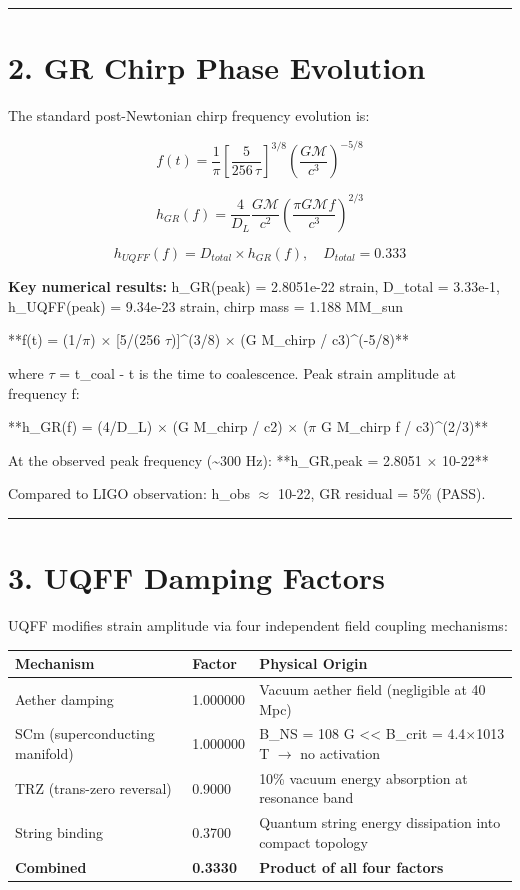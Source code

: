 \documentclass[11pt]{article}
\begin{document}
\noindent\rule{\textwidth}{0.4pt}

\section*{2. GR Chirp Phase Evolution}

The standard post-Newtonian chirp frequency evolution is:

$$f(t) = \frac{1}{\pi}\left[\frac{5}{256\,\tau}\right]^{3/8} \left(\frac{G\mathcal{M}}{c^3}\right)^{-5/8}$$

$$h_{GR}(f) = \frac{4}{D_L}\frac{G\mathcal{M}}{c^2}\left(\frac{\pi G\mathcal{M} f}{c^3}\right)^{2/3}$$

$$h_{UQFF}(f) = D_{total} \times h_{GR}(f),\quad D_{total} = 0.333$$

\textbf{Key numerical results:} h\_GR(peak) = 2.8051e-22 strain, D\_total = 3.33e-1, h\_UQFF(peak) = 9.34e-23 strain, chirp mass = 1.188 MM\_sun

**f(t) = (1/$\pi$) $\times$ [5/(256 $\tau$)]\textasciicircum{}(3/8) $\times$ (G M\_chirp / c3)\textasciicircum{}(-5/8)**

where $\tau$ = t\_coal - t is the time to coalescence. Peak strain amplitude at frequency f:

**h\_GR(f) = (4/D\_L) $\times$ (G M\_chirp / c2) $\times$ ($\pi$ G M\_chirp f / c3)\textasciicircum{}(2/3)**

At the observed peak frequency (\textasciitilde{}300 Hz): **h\_GR,peak = 2.8051 $\times$ 10-22**

Compared to LIGO observation: h\_obs $\approx$ 10-22, GR residual = 5\% (PASS).

\noindent\rule{\textwidth}{0.4pt}

\section*{3. UQFF Damping Factors}

UQFF modifies strain amplitude via four independent field coupling mechanisms:

\begin{center}
\begin{longtable}{lll}
\toprule
Mechanism & Factor & Physical Origin \tabularnewline
\midrule
\endhead
Aether damping & 1.000000 & Vacuum aether field (negligible at 40 Mpc) \tabularnewline
SCm (superconducting manifold) & 1.000000 & B\_NS = 108 G << B\_crit = 4.4$\times$1013 T $\to$ no activation \tabularnewline
TRZ (trans-zero reversal) & 0.9000 & 10\% vacuum energy absorption at resonance band \tabularnewline
String binding & 0.3700 & Quantum string energy dissipation into compact topology \tabularnewline
\textbf{Combined} & \textbf{0.3330} & \textbf{Product of all four factors} \tabularnewline
\bottomrule
\end{longtable}
\end{center}
\end{document}

